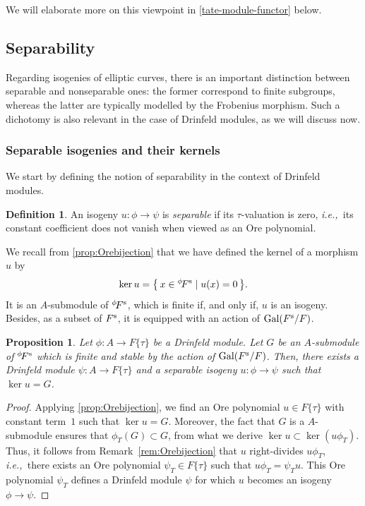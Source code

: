 \documentclass[11pt]{article}
\newtheorem{proposition}[theorem]{Proposition}
\theoremstyle{definition}
\newtheorem{definition}[theorem]{Definition}
\newcommand{\Fs}{F^{\text{\rm s}}}
\newcommand{\Gal}{\text{\rm Gal}}
\newcommand{\phiact}[1]{{}^\phi\! #1}
\newcommand{\ie}{\textit{i.e.,~}}
\begin{document}
We will elaborate more on this viewpoint
in \cref{tate-module-functor} below.

\subsection{Separability}
Regarding isogenies of elliptic curves, there is an important distinction between separable and nonseparable ones: the former correspond to finite subgroups, whereas the latter are typically modelled by the Frobenius morphism. Such a dichotomy is also relevant in the case of Drinfeld modules, as we will discuss now.

\subsubsection{Separable isogenies and their kernels}
We start by defining the notion of separability in the 
context of Drinfeld modules.
\begin{definition}
\label{def:separable}
An isogeny $u : \phi \to \psi$ is \emph{separable} if its 
$\tau$-valuation is zero, \ie its constant coefficient does not vanish 
when viewed as an Ore polynomial.
\end{definition}

We recall from \cref{prop:Orebijection}
that we have defined the kernel of a morphism $u$ by
$$\ker u = \big\{\, x \in \phiact\Fs \mid u(x) = 0 \,\big\}.$$
It is an $A$-submodule of $\phiact \Fs$, which is finite if, and
only if, $u$ is an isogeny. Besides, as a subset of $\Fs$, it is
equipped with an action of $\Gal(\Fs/F)$.

\begin{proposition}
\label{prop:velu}
Let $\phi : A\to F\{\tau\}$ be a Drinfeld module.
Let $G$ be an $A$-submodule of $\phiact\Fs$ which is finite and stable by 
the action of $\Gal(\Fs/F)$. Then, there exists a Drinfeld module $\psi :
A \to F\{\tau\}$ and a separable isogeny $u : \phi \to \psi$ such that 
$\ker u = G$.
\end{proposition}
\begin{proof}
Applying \cref{prop:Orebijection}, we find an Ore polynomial 
$u \in F\{\tau\}$ with constant term~$1$ such that $\ker u = G$.
Moreover, the fact that $G$ is a $A$-submodule ensures that 
$\phi_T(G) \subset G$, from what we derive $\ker u 
\subset \ker(u \phi_T)$. Thus, it follows from 
Remark~\ref{rem:Orebijection} that $u$ right-divides $u \phi_T$, 
\ie there exists an Ore polynomial $\psi_T \in F\{\tau\}$ such 
that $u \phi_T = \psi_T u$. This Ore polynomial $\psi_T$ defines a 
Drinfeld module $\psi$ for which $u$ becomes an isogeny $\phi \to \psi$.
\end{proof}
\end{document}
